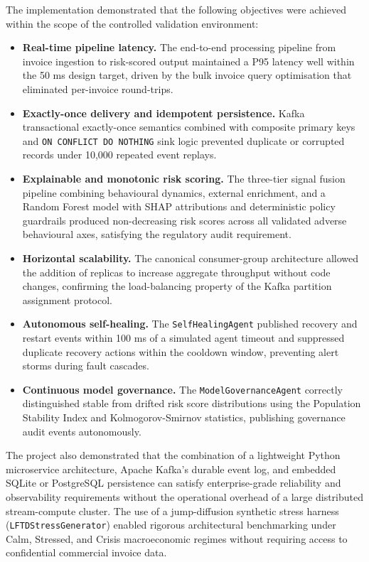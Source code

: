 \documentclass[a4paper, 12pt]{report}
\begin{document}
The implementation demonstrated that the following objectives were achieved within the scope of the controlled validation environment:

\begin{itemize}[itemsep=2pt]
    \item \textbf{Real-time pipeline latency.} The end-to-end processing pipeline from invoice ingestion to risk-scored output maintained a P95 latency well within the 50 ms design target, driven by the bulk invoice query optimisation that eliminated per-invoice round-trips.
    \item \textbf{Exactly-once delivery and idempotent persistence.} Kafka transactional exactly-once semantics combined with composite primary keys and \texttt{ON CONFLICT DO NOTHING} sink logic prevented duplicate or corrupted records under 10,000 repeated event replays.
    \item \textbf{Explainable and monotonic risk scoring.} The three-tier signal fusion pipeline combining behavioural dynamics, external enrichment, and a Random Forest model with SHAP attributions and deterministic policy guardrails produced non-decreasing risk scores across all validated adverse behavioural axes, satisfying the regulatory audit requirement.
    \item \textbf{Horizontal scalability.} The canonical consumer-group architecture allowed the addition of replicas to increase aggregate throughput without code changes, confirming the load-balancing property of the Kafka partition assignment protocol.
    \item \textbf{Autonomous self-healing.} The \texttt{SelfHealingAgent} published recovery and restart events within 100 ms of a simulated agent timeout and suppressed duplicate recovery actions within the cooldown window, preventing alert storms during fault cascades.
    \item \textbf{Continuous model governance.} The \texttt{ModelGovernanceAgent} correctly distinguished stable from drifted risk score distributions using the Population Stability Index and Kolmogorov-Smirnov statistics, publishing governance audit events autonomously.
\end{itemize}

The project also demonstrated that the combination of a lightweight Python microservice architecture, Apache Kafka's durable event log, and embedded SQLite or PostgreSQL persistence can satisfy enterprise-grade reliability and observability requirements without the operational overhead of a large distributed stream-compute cluster. The use of a jump-diffusion synthetic stress harness (\texttt{LFTDStressGenerator}) enabled rigorous architectural benchmarking under Calm, Stressed, and Crisis macroeconomic regimes without requiring access to confidential commercial invoice data.
\end{document}

